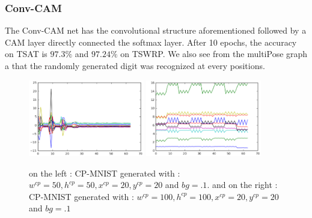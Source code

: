 			\subsubsection{Conv-CAM}
			\label{ssub:conv_cam}
				The Conv-CAM net has the convolutional structure aforementioned followed by a CAM layer directly connected the softmax layer. 
				After 10 epochs, the accuracy on TSAT is $97.3\%$ and $97.24\%$ on TSWRP. We also see from the multiPose graph a that the randomly generated digit was recognized at every positions.

			
			

				\begin{figure}[h]
					\centering
					\includegraphics[width=0.45\textwidth]{images/multiPosGraphConvFC}
					\includegraphics[width=0.45\textwidth]{images/multiPosGraphConvCAM}
					\caption{on the left : CP-MNIST generated with : $w^{cp}=50,h^{cp}=50, x^{cp}=20,y^{cp}=20$ and $bg=.1$. and on the right : CP-MNIST generated with : $w^{cp}=100,h^{cp}=100, x^{cp}=20,y^{cp}=20$ and $bg=.1$}
					\label{fig:CP_MNIST_5050_2020_noisy}
				\end{figure}

			




